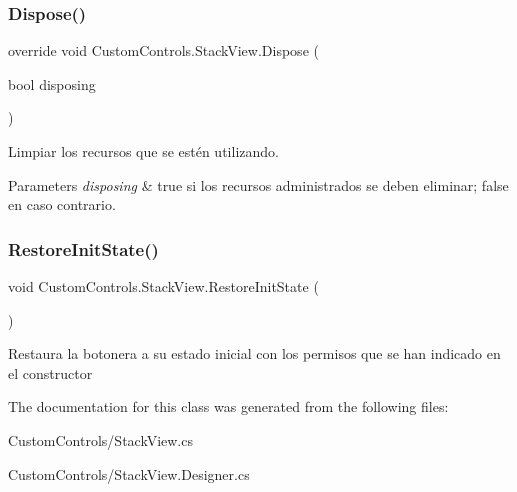 \subsubsection{\texorpdfstring{Dispose()}{Dispose()}}
{\footnotesize\ttfamily override void Custom\+Controls.\+Stack\+View.\+Dispose (\begin{DoxyParamCaption}\item[{bool}]{disposing }\end{DoxyParamCaption})\hspace{0.3cm}{\ttfamily [protected]}}



Limpiar los recursos que se estén utilizando. 


\begin{DoxyParams}{Parameters}
{\em disposing} & true si los recursos administrados se deben eliminar; false en caso contrario.\\
\hline
\end{DoxyParams}
\mbox{\label{class_custom_controls_1_1_stack_view_aa6ee6db47352fbb47bc1292ea7f58611}} 
\subsubsection{\texorpdfstring{Restore\+Init\+State()}{RestoreInitState()}}
{\footnotesize\ttfamily void Custom\+Controls.\+Stack\+View.\+Restore\+Init\+State (\begin{DoxyParamCaption}{ }\end{DoxyParamCaption})}



Restaura la botonera a su estado inicial con los permisos que se han indicado en el constructor 



The documentation for this class was generated from the following files\+:\begin{DoxyCompactItemize}
\item 
Custom\+Controls/Stack\+View.\+cs\item 
Custom\+Controls/Stack\+View.\+Designer.\+cs\end{DoxyCompactItemize}
